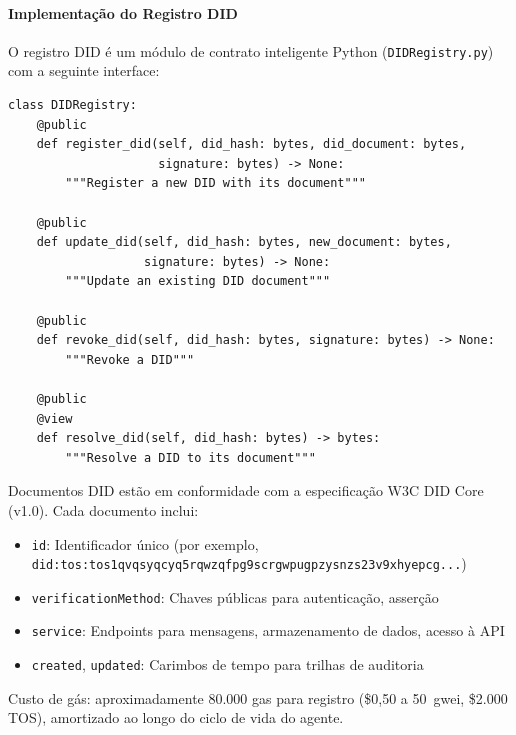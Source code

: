 \documentclass[11pt]{article}
\begin{document}
\paragraph{Implementação do Registro DID} O registro DID é um módulo de contrato inteligente Python (\texttt{DIDRegistry.py}) com a seguinte interface:
\begin{verbatim}
class DIDRegistry:
    @public
    def register_did(self, did_hash: bytes, did_document: bytes,
                     signature: bytes) -> None:
        """Register a new DID with its document"""

    @public
    def update_did(self, did_hash: bytes, new_document: bytes,
                   signature: bytes) -> None:
        """Update an existing DID document"""

    @public
    def revoke_did(self, did_hash: bytes, signature: bytes) -> None:
        """Revoke a DID"""

    @public
    @view
    def resolve_did(self, did_hash: bytes) -> bytes:
        """Resolve a DID to its document"""
\end{verbatim}
Documentos DID estão em conformidade com a especificação W3C DID Core (v1.0). Cada documento inclui:
\begin{itemize}[noitemsep]
  \item \texttt{id}: Identificador único (por exemplo, \texttt{did:tos:tos1qvqsyqcyq5rqwzqfpg9scrgwpugpzysnzs23v9xhyepcg...})
  \item \texttt{verificationMethod}: Chaves públicas para autenticação, asserção
  \item \texttt{service}: Endpoints para mensagens, armazenamento de dados, acesso à API
  \item \texttt{created}, \texttt{updated}: Carimbos de tempo para trilhas de auditoria
\end{itemize}
Custo de gás: aproximadamente 80.000 gas para registro (\$0,50 a 50~gwei, \$2.000 TOS), amortizado ao longo do ciclo de vida do agente.
\end{document}
